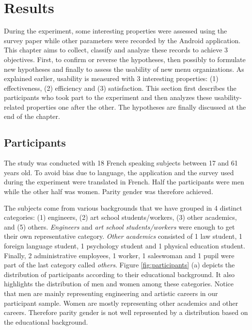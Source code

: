 \chapter{Results}

During the experiment, some interesting properties were assessed using the 
survey paper while other parameters were recorded by the Android application. 
This chapter aims to collect, classify and analyze these records to 
achieve 3 objectives. First, to confirm or reverse the hypotheses, then 
possibly to formulate new hypotheses and finally to assess the usability of 
new menu organizations. As explained earlier, usability is measured with 3 
interesting properties: (1)  effectiveness, (2) efficiency and (3) 
satisfaction. This section first describes the participants who took part to 
the experiment and then analyzes these usability-related properties one after 
the other. The hypotheses are finally discussed at the end of the chapter.

\section{Participants}

The study was conducted with 18 French speaking subjects between 17 and 61 
years old. To avoid bias due to language, the application and the survey 
used during the experiment were translated in French. Half the participants 
were men while the other half was women. Parity gender was therefore 
achieved.\newline

The subjects come from various backgrounds that we have grouped in 4 
distinct categories: (1) engineers, (2) art school students/workers, (3) other 
academics, and (5) others. \textit{Engineers} and \textit{art school 
students/workers} were enough to get their own representative 
category. \textit{Other academics} consisted of 1 law student, 1 foreign 
language student, 1 psychology student and 1 physical education student. 
Finally, 2 
administrative employees, 1 worker, 1 saleswoman and 1 pupil were part of the 
last category called \textit{others}. Figure \ref{fig:participants} (a) depicts 
the distribution of participants according to their educational background. It 
also highlights the distribution of men and women among these categories. 
Notice that men are mainly representing engineering and artistic careers in our 
participant sample. Women are mostly representing other academics and 
other careers. Therefore parity gender is not well represented by a 
distribution based on the educational background.

